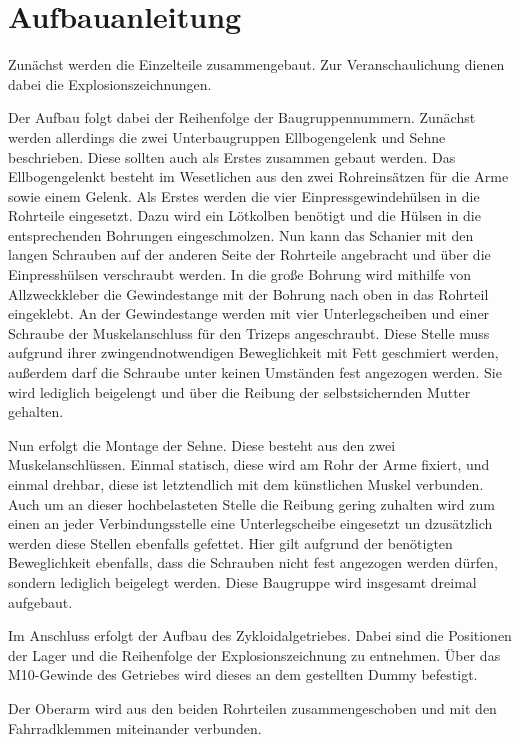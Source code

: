 \chapter{Aufbauanleitung}
Zunächst werden die Einzelteile zusammengebaut. 
Zur Veranschaulichung dienen dabei die Explosionszeichnungen. \par \medskip
Der Aufbau folgt dabei der Reihenfolge der Baugruppennummern. 
Zunächst werden allerdings die zwei Unterbaugruppen Ellbogengelenk und Sehne beschrieben.
Diese sollten auch als Erstes zusammen gebaut werden.
Das Ellbogengelenkt besteht im Wesetlichen aus den zwei Rohreinsätzen für die Arme sowie einem Gelenk.
Als Erstes werden die vier Einpressgewindehülsen in die Rohrteile eingesetzt. 
Dazu wird ein Lötkolben benötigt und die Hülsen in die entsprechenden Bohrungen eingeschmolzen. 
Nun kann das Schanier mit den langen Schrauben auf der anderen Seite der Rohrteile angebracht und über die Einpresshülsen verschraubt werden. 
In die große Bohrung wird mithilfe von Allzweckkleber die Gewindestange mit der Bohrung nach oben in das Rohrteil eingeklebt. 
An der Gewindestange werden mit vier Unterlegscheiben und einer Schraube der Muskelanschluss für den Trizeps angeschraubt. 
Diese Stelle muss aufgrund ihrer zwingendnotwendigen Beweglichkeit mit Fett geschmiert werden, außerdem darf die Schraube unter keinen Umständen fest angezogen werden. 
Sie wird lediglich beigelengt und über die Reibung der selbstsichernden Mutter gehalten. \par
Nun erfolgt die Montage der Sehne. 
Diese besteht aus den zwei Muskelanschlüssen. Einmal statisch, diese wird am Rohr der Arme fixiert, und einmal drehbar, diese ist letztendlich mit dem künstlichen Muskel verbunden. 
Auch um an dieser hochbelasteten Stelle die Reibung gering zuhalten wird zum einen an jeder Verbindungsstelle eine Unterlegscheibe eingesetzt un dzusätzlich werden diese Stellen ebenfalls gefettet.
Hier gilt aufgrund der benötigten Beweglichkeit ebenfalls, dass die Schrauben nicht fest angezogen werden dürfen, sondern lediglich beigelegt werden. 
Diese Baugruppe wird insgesamt dreimal aufgebaut. \par
Im Anschluss erfolgt der Aufbau des Zykloidalgetriebes.
Dabei sind die Positionen der Lager und die Reihenfolge der Explosionszeichnung zu entnehmen.
Über das M10-Gewinde des Getriebes wird dieses an dem gestellten Dummy befestigt. \par
Der Oberarm wird aus den beiden Rohrteilen zusammengeschoben und mit den Fahrradklemmen miteinander verbunden.
